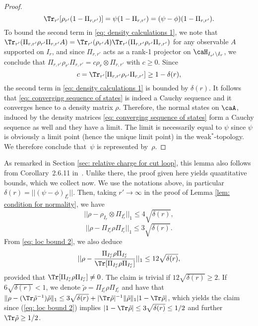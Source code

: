 \begin{proof}
	\begin{equation*}
	\Tr_{r'} [\rho_{r'} (1-\Pi_{r,r'})] = \psi(1-\Pi_{r,r'}) = (\psi - \phi)(1-\Pi_{r,r'}).
	\end{equation*}
	To bound the second term in \eqref{eq: density calculations 1}, we note that $\Tr_{r'}(\Pi_{r,r'} \rho_{r'}\Pi_{r,r'}A) = \Tr_{r'}(\rho_{r'}A) \Tr_{r'}(\Pi_{r,r'} \rho_{r'}\Pi_{r,r'})$ for any observable $A$ supported on $I_r$, and since $\Pi_{r,r'}$ acts as a rank-1 projector on $\caH_{I_{r'}\setminus I_r}$, we conclude that 
	$\Pi_{r,r'} \rho_{r'}\Pi_{r,r'}=c\rho_r\otimes \Pi_{r,r'}$ with $c\geq 0$.  Since 
	$$
	c=\Tr_{r'} [\Pi_{r,r'} \rho_{r'}\Pi_{r,r'}]\geq 1-\delta(r),
	$$ 
	the second term in \eqref{eq: density calculations 1} is bounded by $\delta(r)$.  It follows that \eqref{eq: converging sequence of states} is indeed a Cauchy sequence and it converges hence to a density matrix $\rho$. Therefore, the normal states on $\caA$, induced by the density matrices \eqref{eq: converging sequence of states} form a Cauchy sequence as well and they have a limit. The limit is necessarily equal to $\psi$ since $\psi$ is obviously a limit point (hence the unique limit point)  in the weak$^*$-topology. We therefore conclude that~$\psi$ is represented by~$\rho$.  
\end{proof}

As remarked in Section \ref{sec: relative charge for cut loop},  this lemma also follows from Corollary~2.6.11 in~\cite{BratRob}.  Unlike there, the proof given here yields quantitative bounds, which we collect now. We use the notations above, in particular $\delta(r)=||(\psi-\phi)_{{I_{r}^c}}||$. Then, taking $r'\to\infty$ in the proof of Lemma \ref{lem: condition for normality}, we have
\begin{equation} \label{eq: loc bound 1}
||\rho-\rho_{I_r} \otimes \Pi_{I_{r}^c}||_1 \leq  4\sqrt{\delta(r)},
\end{equation}
\begin{equation}\label{eq: loc bound 2}
||\rho- \Pi_{I_{r}^c}\rho \Pi_{I_{r}^c} ||_1 \leq  3\sqrt{\delta(r)}.
\end{equation}
From \eqref{eq: loc bound 2}, we also deduce 
\begin{equation} \label{eq: loc bound 3}
||\rho- \frac{\Pi_{I_{r}^c}\rho \Pi_{I_{r}^c}}{\Tr[\Pi_{I_{r}^c}\rho \Pi_{I_{r}^c}]}||_1\leq    12 \sqrt{\delta(r)},  
\end{equation}
provided that $\Tr[\Pi_{I_{r}^c}\rho \Pi_{I_{r}^c}]\neq 0$. The claim is trivial if $12 \sqrt{\delta(r)}\geq 2$. If $6 \sqrt{\delta(r)}< 1$, we denote $\tilde\rho = \Pi_{I_{r}^c}\rho \Pi_{I_{r}^c}$ and have that $\Vert\rho - (\Tr\tilde\rho^{-1})\tilde\rho\Vert_1\leq 3\sqrt{\delta(r)} + \vert\Tr\tilde\rho\vert^{-1}\Vert \tilde\rho\Vert_1\vert 1-\Tr\tilde\rho\vert$, which yields the claim since (\ref{eq: loc bound 2}) implies $\vert 1- \Tr\tilde\rho\vert\leq 3\sqrt{\delta(r)} \leq 1/2$ and further $\Tr\tilde\rho\geq 1/2$. 



